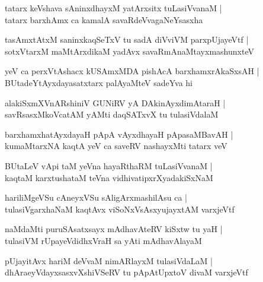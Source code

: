 \documentclass[twoside,12pt,openright]{book}
\newcounter{shloka}[chapter]
\begin{document}
\begin{shloka}%
tatarx keVshava sAninxdhayxM yatArxsitx tuLasiVvanaM |\\
tatarx barxhAmx ca kamalA savaRdeVvagaNeYsasxha 
\end{shloka}

\begin{shloka}%
tasAmxtAtxM saninxkaqSeTxV tu sadA diVviVM parxpUjayeVtf |\\
sotxVtarxM maMtArxdikaM yadAvx savaRmAnaMtayxmashunxteV 
\end{shloka}

\begin{shloka}%
yeV ca perxVtAshacx kUSAmxMDA pishAcA barxhamxrAkaSxsAH |\\
BUtadeYtAyxdayasatxtarx palAyaMteV sadeYva hi 
\end{shloka}

\begin{shloka}%
alakiSxmXVnARshiniV GUNiRV yA DAkinAyxdimAtaraH |\\
savRsasxMkoVcatAM yAMti daqSATxvX tu tulasiVdalaM 
\end{shloka}

\begin{shloka}%
barxhamxhatAyxdayaH pApA vAyxdhayaH pApasaMBavAH |\\
kumaMtarxNA kaqtA yeV ca saveRV nashayxMti tatarx veV 
\end{shloka}

\begin{shloka}%
BUtaLeV vApi taM yeVna hayaRthaRM tuLasiVvanaM |\\
kaqtaM karxtushataM teVna vidhivatipxrXyadakiSxNaM 
\end{shloka}

\begin{shloka}%
hariliMgeVSu cAneyxVSu sAligArxmashilAsu ca |\\
tulasiVgarxhaNaM kaqtAvx viSoNxVsAsxyujayxtAM varxjeVtf 
\end{shloka}

\begin{shloka}%
naMdaMti puruSAsatxsayx mAdhavAteRV kiSxtw tu yaH |\\
tulasiVM rUpayeVdidhxVraH sa yAti mAdhavAlayaM
\end{shloka}

\begin{shloka}%
pUjayitAvx hariM deVvaM nimARlayxM tulasiVdaLaM |\\
dhAraeyVdayxsasxvXshiVSeRV tu pApAtUpxtoV divaM varxjeVtf
\end{shloka}
\end{document}
